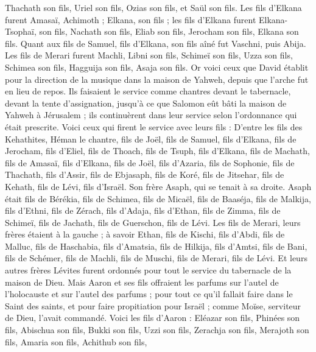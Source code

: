 \begin{multicols}{2}
Thachath son fils, Uriel son fils, Ozias son fils, et Saül son fils.
Les fils d'Elkana furent Amasaï, Achimoth ;
Elkana, son fils ; les fils d'Elkana furent Elkana-Tsophaï, son fils, Nachath son fils,
Eliab son fils, Jerocham son fils, Elkana son fils.
Quant aux fils de Samuel, fils d'Elkana, son fils aîné fut Vaschni, puis Abija.
Les fils de Merari furent Machli, Libni son fils, Schimeï son fils, Uzza son fils,
Schimea son fils, Hagguija son fils, Asaja son fils.
Or voici ceux que David établit pour la direction de la musique dans la maison de Yahweh, depuis que l'arche fut en lieu de repos.
Ils faisaient le service comme chantres devant le tabernacle, devant la tente d'assignation, jusqu'à ce que Salomon eût bâti la maison de Yahweh à Jérusalem ; ils continuèrent dans leur service selon l'ordonnance qui était prescrite.
Voici ceux qui firent le service avec leurs fils : D'entre les fils des Kehathites, Héman le chantre, fils de Joël, fils de Samuel,
fils d'Elkana, fils de Jerocham, fils d'Eliel, fils de Thoach,
fils de Tsuph, fils d'Elkana, fils de Machath, fils de Amasaï,
fils d'Elkana, fils de Joël, fils d'Azaria, fils de Sophonie,
fils de Thachath, fils d'Assir, fils de Ebjasaph, fils de Koré,
fils de Jitsehar, fils de Kehath, fils de Lévi, fils d'Israël.
Son frère Asaph, qui se tenait à sa droite. Asaph était fils de Bérékia, fils de Schimea,
fils de Micaël, fils de Baaséja, fils de Malkija,
fils d'Ethni, fils de Zérach, fils d'Adaja,
fils d'Ethan, fils de Zimma, fils de Schimeï,
fils de Jachath, fils de Guerschon, fils de Lévi.
Les fils de Merari, leurs frères étaient à la gauche ; à savoir Ethan, fils de Kischi, fils d'Abdi, fils de Malluc,
fils de Haschabia, fils d'Amatsia, fils de Hilkija,
fils d'Amtsi, fils de Bani, fils de Schémer,
fils de Machli, fils de Muschi, fils de Merari, fils de Lévi.
Et leurs autres frères Lévites furent ordonnés pour tout le service du tabernacle de la maison de Dieu.
Mais Aaron et ses fils offraient les parfums sur l'autel de l'holocauste et sur l'autel des parfums ; pour tout ce qu'il fallait faire dans le Saint des saints, et pour faire propitiation pour Israël ; comme Moïse, serviteur de Dieu, l'avait commandé.
Voici les fils d'Aaron : Eléazar son fils, Phinées son fils, Abischua son fils,
Bukki son fils, Uzzi son fils, Zerachja son fils,
Merajoth son fils, Amaria son fils, Achithub son fils,

\end{multicols}
